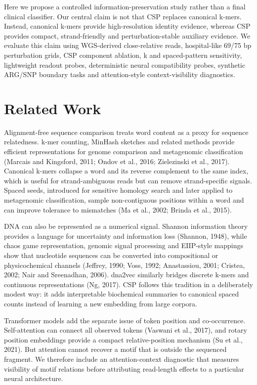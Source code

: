 \documentclass[10.5pt]{article}
\begin{document}
Here we propose a controlled information-preservation study rather than a final clinical classifier. Our central claim is not that CSP replaces canonical k-mers. Instead, canonical k-mers provide high-resolution identity evidence, whereas CSP provides compact, strand-friendly and perturbation-stable auxiliary evidence. We evaluate this claim using WGS-derived close-relative reads, hospital-like 69/75 bp perturbation grids, CSP component ablation, k and spaced-pattern sensitivity, lightweight readout probes, deterministic neural compatibility probes, synthetic ARG/SNP boundary tasks and attention-style context-visibility diagnostics.


\section*{Related Work}

Alignment-free sequence comparison treats word content as a proxy for sequence relatedness. k-mer counting, MinHash sketches and related methods provide efficient representations for genome comparison and metagenomic classification (Marcais and Kingsford, 2011; Ondov et al., 2016; Zielezinski et al., 2017). Canonical k-mers collapse a word and its reverse complement to the same index, which is useful for strand-ambiguous reads but can remove strand-specific signals. Spaced seeds, introduced for sensitive homology search and later applied to metagenomic classification, sample non-contiguous positions within a word and can improve tolerance to mismatches (Ma et al., 2002; Brinda et al., 2015).


DNA can also be represented as a numerical signal. Shannon information theory provides a language for uncertainty and information loss (Shannon, 1948), while chaos game representation, genomic signal processing and EIIP-style mappings show that nucleotide sequences can be converted into compositional or physicochemical channels (Jeffrey, 1990; Voss, 1992; Anastassiou, 2001; Cristea, 2002; Nair and Sreenadhan, 2006). dna2vec similarly bridges discrete k-mers and continuous representations (Ng, 2017). CSP follows this tradition in a deliberately modest way: it adds interpretable biochemical summaries to canonical spaced counts instead of learning a new embedding from large corpora.


Transformer models add the separate issue of token position and co-occurrence. Self-attention can connect all observed tokens (Vaswani et al., 2017), and rotary position embeddings provide a compact relative-position mechanism (Su et al., 2021). But attention cannot recover a motif that is outside the sequenced fragment. We therefore include an attention-context diagnostic that measures visibility of motif relations before attributing read-length effects to a particular neural architecture.
\end{document}
